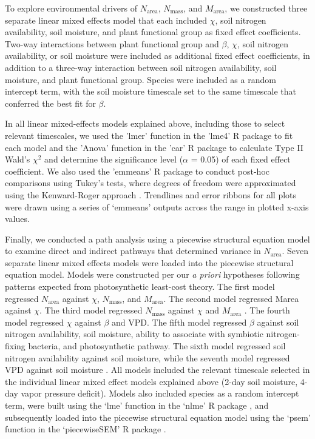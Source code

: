 To explore environmental drivers of $N_\mathrm{area}$, $N_\mathrm{mass}$, and $M_\mathrm{area}$, we constructed three separate linear mixed effects model that each included $\chi$, soil nitrogen availability, soil moisture, and plant functional group as fixed effect coefficients. Two-way interactions between plant functional group and $\beta$, $\chi$, soil nitrogen availability, or soil moisture were included as additional fixed effect coefficients, in addition to a three-way interaction between soil nitrogen availability, soil moisture, and plant functional group. Species were included as a random intercept term, with the soil moisture timescale set to the same timescale that conferred the best fit for $\beta$.

In all linear mixed-effects models explained above, including those to select relevant timescales, we used the 'lmer' function in the 'lme4' R package  to fit each model and the 'Anova' function in the 'car' R package  to calculate Type II Wald's $\chi^2$ and determine the significance level ($\alpha$ = 0.05) of each fixed effect coefficient. We also used the 'emmeans' R package  to conduct post-hoc comparisons using Tukey's tests, where degrees of freedom were approximated using the Kenward-Roger approach . Trendlines and error ribbons for all plots were drawn using a series of ‘emmeans’ outputs across the range in plotted x-axis values.

Finally, we conducted a path analysis using a piecewise structural equation model to examine direct and indirect pathways that determined variance in $N_\mathrm{area}$. Seven separate linear mixed effects models were loaded into the piecewise structural equation model. Models were constructed per our \textit{a priori} hypotheses following patterns expected from photosynthetic least-cost theory. The first model regressed $N_\mathrm{area}$ against $\chi$, $N_\mathrm{mass}$, and $M_\mathrm{area}$. The second model regressed Marea against $\chi$. The third model regressed $N_\mathrm{mass}$ against $\chi$ and $M_\mathrm{area}$ . The fourth model regressed $\chi$ against $\beta$ and VPD. The fifth model regressed $\beta$ against soil nitrogen availability, soil moisture, ability to associate with symbiotic nitrogen-fixing bacteria, and photosynthetic pathway. The sixth model regressed soil nitrogen availability against soil moisture, while the seventh model regressed VPD against soil moisture . All models included the relevant timescale selected in the individual linear mixed effect models explained above (2-day soil moisture, 4-day vapor pressure deficit). Models also included species as a random intercept term, were built using the ‘lme’ function in the ‘nlme’ R package , and subsequently loaded into the piecewise structural equation model using the ‘psem’ function in the ‘piecewiseSEM’ R package .

